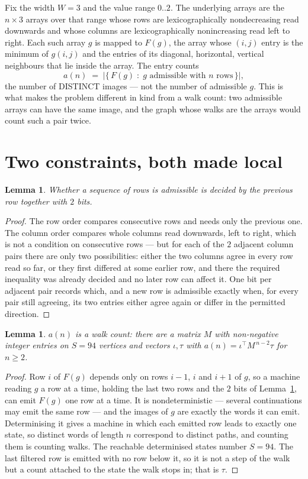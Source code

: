 \documentclass[11pt,a4paper]{article}
\theoremstyle{plain}
\newtheorem{lemma}[theorem]{Lemma}
\theoremstyle{definition}
\begin{document}
Fix the width $W=3$ and the value range $0..2$. The underlying arrays are the
$n\times3$ arrays over that range whose rows are lexicographically nondecreasing read downwards
and whose columns are lexicographically nonincreasing read left to right. Each such array $g$
is mapped to $F(g)$, the array whose $(i,j)$ entry is the minimum of $g(i,j)$ and the entries
of its diagonal, horizontal, vertical neighbours that lie inside the array. The entry counts
\[
a(n)\;=\;\bigl|\{\,F(g)\;:\;g\text{ admissible with }n\text{ rows}\,\}\bigr|,
\]
the number of DISTINCT images --- not the number of admissible $g$. This is what makes the
problem different in kind from a walk count: two admissible arrays can have the same image, and
the graph whose walks are the arrays would count such a pair twice.

\section{Two constraints, both made local}

\begin{lemma}\label{lem:local}
Whether a sequence of rows is admissible is decided by the previous row together with
$2$ bits.
\end{lemma}

\begin{proof}
The row order compares consecutive rows and needs only the previous one. The column order
compares whole columns read downwards, left to right, which is not a condition on consecutive
rows --- but for each of the $2$ adjacent column pairs there are only two possibilities:
either the two columns agree in every row read so far, or they first differed at some earlier
row, and there the required inequality was already decided and no later row can affect it. One
bit per adjacent pair records which, and a new row is admissible exactly when, for every pair
still agreeing, its two entries either agree again or differ in the permitted direction.
\end{proof}

\begin{lemma}\label{lem:det}
$a(n)$ is a walk count: there are a matrix $M$ with non-negative integer entries on $S=94$
vertices and vectors $\iota,\tau$ with $a(n)=\iota^{\!\top}M^{\,n-2}\tau$ for $n\ge2$.
\end{lemma}

\begin{proof}
Row $i$ of $F(g)$ depends only on rows $i-1$, $i$ and $i+1$ of $g$, so a machine reading $g$ a
row at a time, holding the last two rows and the $2$ bits of Lemma~\ref{lem:local}, can
emit $F(g)$ one row at a time. It is nondeterministic --- several continuations may emit the
same row --- and the images of $g$ are exactly the words it can emit. Determinising it gives a
machine in which each emitted row leads to exactly one state, so distinct words of length $n$
correspond to distinct paths, and counting them is counting walks. The reachable determinised
states number $S=94$. The last filtered row is emitted with no row below it, so it is not a
step of the walk but a count attached to the state the walk stops in; that is $\tau$.
\end{proof}
\end{document}
